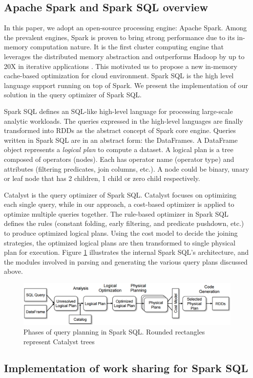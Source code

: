 \subsection{Apache Spark and Spark SQL overview}
% 
In this paper, we adopt an open-source processing engine: Apache Spark. Among the prevalent engines, Spark is proven to bring strong performance due to its in-memory computation nature. It is the first cluster computing engine that leverages the distributed memory abstraction and outperforms Hadoop by up to 20X in iterative applications \cite{zaharia2012resilient}. This motivated us to propose a new in-memory cache-based optimization for cloud environment. Spark SQL is the high level language support running on top of Spark. We present the implementation of our solution in the query optimizer of Spark SQL.

Spark SQL defines an SQL-like high-level language for processing large-scale analytic workloads. The queries expressed in the high-level languages are finally transformed into RDDs as the abstract concept of Spark core engine. Queries written in Spark SQL are in an abstract form: the DataFrames. A DataFrame object represents a \emph{logical plan} to compute a dataset. A logical plan is a tree composed of operators (nodes). Each has operator name (operator type) and attributes (filtering predicates, join columns, etc.). A node could be binary, unary or leaf node that has 2 children, 1 child or zero child respectively.

Catalyst \cite{sparksql} is the query optimizer of Spark SQL. Catalyst focuses on optimizing each single query, while in our approach, a cost-based optimizer is applied to optimize multiple queries together. The rule-based optimizer in Spark SQL defines the rules (constant folding, early filtering, and predicate pushdown, etc.) to produce optimized logical plans. Using the cost model to decide the joining strategies, the optimized logical plans are then transformed to single physical plan for execution. Figure \ref{fig:sparksql_queryplanning} illustrates the internal Spark SQL's architecture, and the modules involved in parsing and generating the various query plans discussed above.

\begin{figure}[t]
   \centering
   \includegraphics[scale=0.45]{figures/sparksql_queryplanning}
   \caption{Phases of query planning in Spark SQL. Rounded rectangles represent Catalyst trees \cite{sparksql}} 
   \label{fig:sparksql_queryplanning}
\end{figure}

\subsection{Implementation of work sharing for Spark SQL}
\label{sec:plan_implementation}
